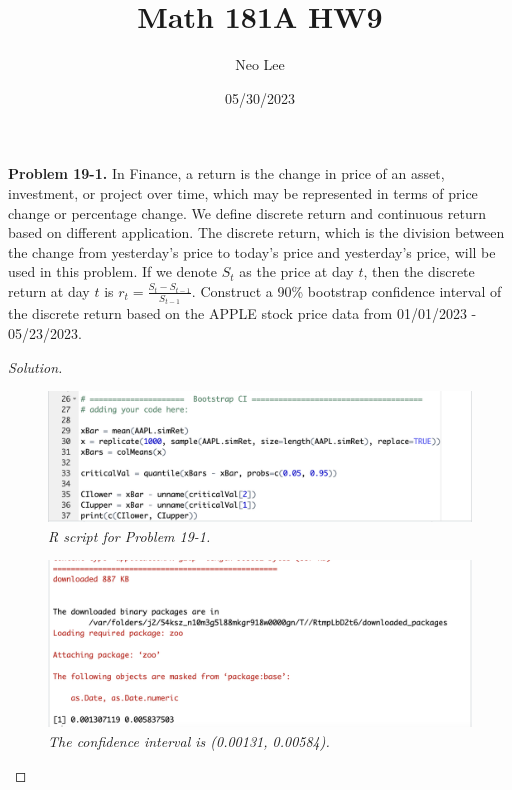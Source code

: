 \documentclass{article}
\title{Math 181A HW9}
\author{Neo Lee}
\date{05/30/2023}
\begin{document}
 

\maketitle 

\textbf{Problem 19-1.}
In Finance, a return is the change in price of an asset, investment, or project over time, which may be represented in terms of price change or percentage change. 
We define discrete return and continuous return based on different application. 
The discrete return, which is the division between the change from yesterday's price to today's price and yesterday's price, will be used in this problem. 
If we denote $S_t$ as the price at day $t$, then the discrete return at day $t$ is $r_t = \frac{S_t-S_{t-1}}{S_{t-1}}$. 
Construct a 90\% bootstrap confidence interval of the discrete return based on the APPLE stock price data from 01/01/2023 - 05/23/2023.
\begin{proof}[Solution] \indent \\
    \begin{figure}[h]
        \centering
        \includegraphics[scale=0.5]{script.png}
        \caption{\emph{R script for Problem 19-1.}}
    \end{figure}
    \begin{figure}[h]
        \centering
        \includegraphics[scale=0.5]{result.png}
        \caption{\emph{The confidence interval is (0.00131, 0.00584).}}
    \end{figure}
\end{proof}
\end{document}
